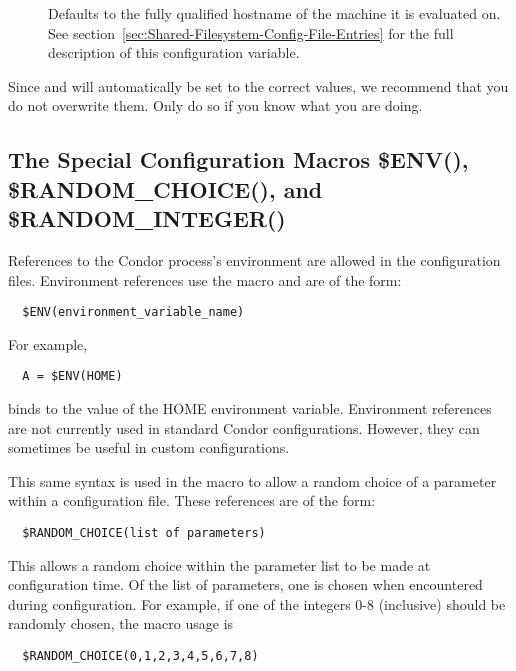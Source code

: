 \begin{description}
\item[]
  \label{param:UIDDomain}
  Defaults to the fully
  qualified hostname of the machine it is evaluated on.  See
  section~\ref{sec:Shared-Filesystem-Config-File-Entries} 
  for the full description of this configuration variable.

\end{description}

Since  and  will automatically be set to the
correct values, we recommend that you do not overwrite them.
Only do so if you know what you are doing.



\subsection{\label{sec:Config-File-Special}The Special Configuration Macros
\$ENV(), \$RANDOM\_CHOICE(), and  \$RANDOM\_INTEGER()} 

References to the Condor process's environment are allowed in the
configuration files.
Environment references use the  macro and are of the form:
\begin{verbatim}
  $ENV(environment_variable_name)
\end{verbatim}
For example, 
\begin{verbatim}
  A = $ENV(HOME)
\end{verbatim}
binds  to the value of the HOME environment variable.
Environment references are not currently used in standard Condor
configurations.
However, they can sometimes be useful in custom configurations.

This same syntax is used in the  macro to
allow a random choice of a parameter
within a configuration file.
These references are of the form:
\begin{verbatim}
  $RANDOM_CHOICE(list of parameters)
\end{verbatim}
This allows a random choice within the parameter list to be made
at configuration time.  Of the list of parameters, one is
chosen when encountered during configuration.  For example,
if one of the integers 0-8 (inclusive) should be randomly
chosen, the macro usage is
\begin{verbatim}
  $RANDOM_CHOICE(0,1,2,3,4,5,6,7,8)
\end{verbatim}

